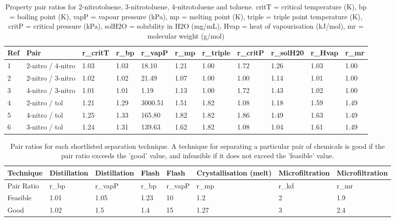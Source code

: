 \begin{landscape}
\begin{table}[H]
\centering
\caption{Property pair ratios for 2-nitrotoluene, 3-nitrotoluene, 4-nitrotoluene and toluene. critT = critical temperature (K), bp = boiling point (K), vapP = vapour pressure (kPa), mp = melting point (K), triple = triple point temperature (K), critP = critical pressure (kPa), solH2O = solubility in H2O (mg/mL), Hvap = heat of vapourisation (kJ/mol), mr = molecular weight (g/mol)}
\label{tab:jaksland}\footnotesize
\begin{tabular}{@{}lllllllllll@{}}
\toprule
Ref & Pair              & r\_critT & r\_bp & r\_vapP & r\_mp & r\_triple & r\_critP & r\_solH20 & r\_Hvap & r\_mr \\ \midrule
1   & 2-nitro / 4-nitro & 1.03     & 1.03  & 18.10   & 1.21  & 1.00      & 1.72     & 1.26      & 1.03    & 1.00  \\
2   & 2-nitro / 3-nitro & 1.02     & 1.02  & 21.49   & 1.07  & 1.00      & 1.00     & 1.14      & 1.01    & 1.00  \\
3   & 4-nitro / 3-nitro & 1.01     & 1.01  & 1.19    & 1.13  & 1.00      & 1.72     & 1.43      & 1.02    & 1.00  \\
4   & 2-nitro / tol     & 1.21     & 1.29  & 3000.51 & 1.51  & 1.82      & 1.08     & 1.18      & 1.59    & 1.49  \\
5   & 4-nitro / tol     & 1.25     & 1.33  & 165.80  & 1.82  & 1.82      & 1.86     & 1.49      & 1.63    & 1.49  \\
6   & 3-nitro / tol     & 1.24     & 1.31  & 139.63  & 1.62  & 1.82      & 1.08     & 1.04      & 1.61    & 1.49  \\ \bottomrule
\end{tabular}
\end{table}


\begin{table}[H]
\centering
\caption{Pair ratios for each shortlisted separation technique. A technique for separating a particular pair of chemicals is good if the pair ratio exceeds the 'good' value, and infeasible if it does not exceed the 'feasible' value.}
\label{tab:separation pair ratio}
\begin{tabular}{@{}llllllll@{}}
\toprule
Technique  & Distillation & Distillation & Flash & Flash   & Crystallisation (melt) & Microfiltration & Microfiltration \\ \midrule
Pair Ratio & r\_bp        & r\_vapP      & r\_bp & r\_vapP & r\_mp                  & r\_kd           & r\_mr           \\
Feasible   & 1.01         & 1.05         & 1.23  & 10      & 1.2                    & 2               & 1.9             \\
Good       & 1.02         & 1.5          & 1.4   & 15      & 1.27                   & 3               & 2.4             \\ \bottomrule
\end{tabular}
\end{table}



\end{landscape}
